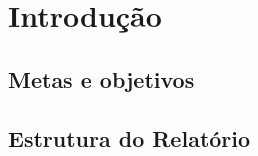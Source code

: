 \chapter*{Introdução}
\label{intro}





\section*{Metas e objetivos} 




\section*{Estrutura do Relatório} 





